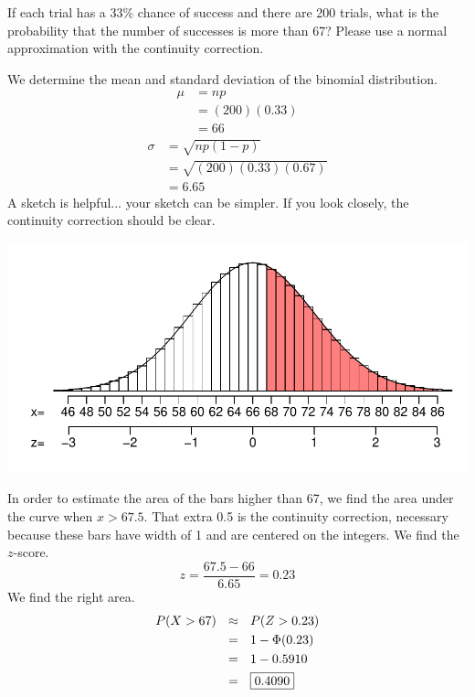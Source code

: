 \documentclass[12pt,letterpaper,addpoints]{exam}
\begin{document}
\begin{questions}
\newpage

\question[10] If each trial has a 33\% chance of success and there are 200 trials, what is the probability that the number of successes is more than 67? Please use a normal approximation with the continuity correction.
\begin{solution}
We determine the mean and standard deviation of the binomial distribution.
\begin{align*}
\mu &= np \\
&= (200)(0.33) \\
&= 66
\end{align*}
\begin{align*}
\sigma &= \sqrt{np(1-p)} \\
&= \sqrt{(200)(0.33)(0.67)} \\
&= 6.65
\end{align*}
A sketch is helpful... your sketch can be simpler. If you look closely, the continuity correction should be clear.
\begin{center}
\includegraphics[scale=1]{figures/sketch6.pdf}
\end{center}
In order to estimate the area of the bars higher than 67, we find the area under the curve when $x>67.5$. That extra 0.5 is the continuity correction, necessary because these bars have width of 1 and are centered on the integers. We find the $z$-score.
$$z = \frac{67.5-66}{6.65} = 0.23 $$
We find the right area.
\begin{align*}
P(X>67) ~~&\approx~~ P(Z>0.23) \\
&=~~ 1-\Phi(0.23) \\
&=~~ 1-0.5910 \\
&=~~ \fbox{0.4090}
\end{align*}
\end{solution}



\newpage


\end{questions}
\end{document}
